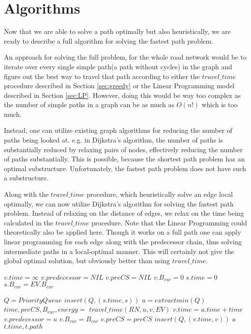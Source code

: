 \section{Algorithms}\label{sec:algo}
Now that we are able to solve a path optimally but also heuristically, we are ready to describe a full algorithm for solving the fastest path problem. 

An approach for solving the full problem, for the whole road network would be to iterate over every single simple path(a path without cycles) in the graph and figure out the best way to travel that path according to either the $travel\_time$ procedure described in Section \ref{sec:greedy} or the Linear Programming model described in Section \ref{sec:LP}. However, doing this would be way too complex as the number of simple paths in a graph can be as much as $O(n!)$ which is too much.

Instead, one can utilize existing graph algorithms for reducing the number of paths being looked at. e.g. in Dijkstra's algorithm, the number of paths is substantially reduced by relaxing pairs of nodes, effectively reducing the number of paths substantially. This is possible, because the shortest path problem has an optimal substructure. Unfortunately, the fastest path problem does not have such a substructure.

Along with the $travel\_time$ procedure, which heuristically solve an edge local optimally, we can now utilize Dijkstra's algorithm for solving the fastest path problem. Instead of relaxing on the distance of edges, we relax on the time being calculated in the $travel\_time$ procedure. Note that the Linear Programming could theoretically also be applied here. Though it works on a full path one can apply linear programming for each edge along with the predecessor chain, thus solving intermediate paths in a local-optimal manner. This will certainly not give the global optimal solution, but obviously better than using $travel\_time$.
\begin{algorithmic}[1]
        \State $v.time = \infty$
        \State $v.predecessor = NIL$
        \State $v.preCS = NIL$
        \State $v.B_{cur} = 0$
    \EndFor
    \State $s.time = 0$
    \State $s.B_{cur} = EV.B_{cur}$

    \State $Q = PriorityQueue$
    \State $insert(Q, (s.time, s))$ 
        \State $u = extractmin(Q)$
            \State $time,preCS,B_{cur},energy = $
            \State $travel\_time(RN, u, v, EV)$
                \State $v.time = u.time + time$
                \State $v.predecessor = u$
                \State $v.B_{cur} = B_{cur}$
                \State $v.preCS = preCS$
                \State $insert(Q, (v.time, v))$ 
            \EndIf
                \State $a$
            \EndIf
        \EndFor
    \EndWhile
    \State \Return $t.time, t.path$
\EndFunction
\end{algorithmic}\label{alg:fastest_path}


